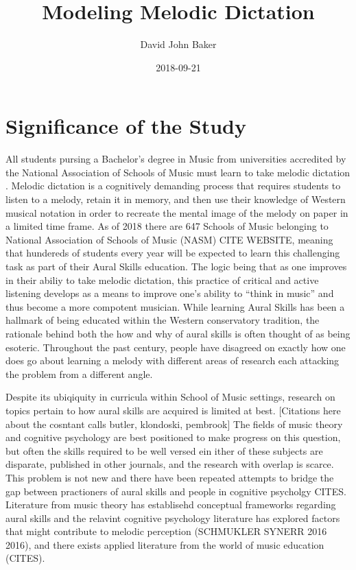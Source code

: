 \documentclass[]{book}
\title{Modeling Melodic Dictation}
\author{David John Baker}
\date{2018-09-21}
\theoremstyle{definition}
\theoremstyle{definition}
\theoremstyle{definition}
\theoremstyle{remark}
\begin{document}
\maketitle

{
\setcounter{tocdepth}{1}
\tableofcontents
}
\hypertarget{significance-of-the-study}{%
\chapter{Significance of the Study}\label{significance-of-the-study}}

All students pursing a Bachelor's degree in Music from universities
accredited by the National Association of Schools of Music must learn to
take melodic dictation \citep[ Section
VIII.6.B.2.A]{NationalAssociationSchools2018}. Melodic dictation is a
cognitively demanding process that requires students to listen to a
melody, retain it in memory, and then use their knowledge of Western
musical notation in order to recreate the mental image of the melody on
paper in a limited time frame. As of 2018 there are 647 Schools of Music
belonging to National Association of Schools of Music (NASM) CITE
WEBSITE, meaning that hundereds of students every year will be expected
to learn this challenging task as part of their Aural Skills education.
The logic being that as one improves in their abiliy to take melodic
dictation, this practice of critical and active listening develops as a
means to improve one's ability to ``think in music'' and thus become a
more compotent musician. While learning Aural Skills has been a hallmark
of being educated within the Western conservatory tradition, the
rationale behind both the how and why of aural skills is often thought
of as being esoteric. Throughout the past century, people have disagreed
on exactly how one does go about learning a melody with different areas
of research each attacking the problem from a different angle.

Despite its ubiqiquity in curricula within School of Music settings,
research on topics pertain to how aural skills are acquired is limited
at best. {[}Citations here about the cosntant calls butler, klondoski,
pembrook{]} The fields of music theory and cognitive psychology are best
positioned to make progress on this question, but often the skills
required to be well versed ein ither of these subjects are disparate,
published in other journals, and the research with overlap is scarce.
This problem is not new and there have been repeated attempts to bridge
the gap between practioners of aural skills and people in cognitive
psycholgy CITES. Literature from music theory has establisehd conceptual
frameworks regarding aural skills
\citet{karpinskiAuralSkillsAcquisition2000} and the relavint cognitive
psychology literature has explored factors that might contribute to
melodic perception (SCHMUKLER SYNERR 2016 2016), and there exists
applied literature from the world of music education (CITES).
\end{document}
